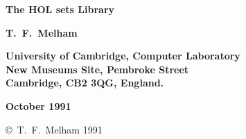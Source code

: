 
\begin{titlepage}

\setcounter{page}{1}		          %


\mbox{}
\vskip20mm
\begin{center}
{\Huge\bf The HOL sets Library}
\end{center}


\vskip15mm
\begin{center}
\large\bf T.\ F.\ Melham
\end{center}


\vfill
\begin{center}
\bf
University of Cambridge, Computer Laboratory\\
New Museums Site, Pembroke Street\\
Cambridge, {\small\bf CB}2 3{\small\bf QG}, England.
\end{center}


\vskip5mm
\begin{center}
\bf October 1991
\end{center}

\end{titlepage}

\thispagestyle{empty}
\mbox{}

\vfill
\begin{center}
\copyright\ T.\ F.\ Melham 1991 
\end{center}
\newpage
